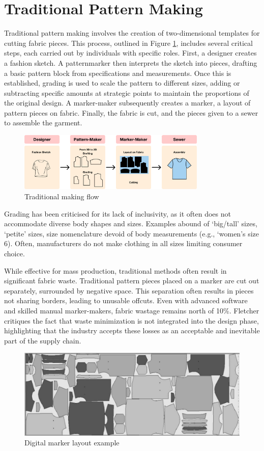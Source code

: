 \section{Traditional Pattern Making}
Traditional pattern making involves the creation of two-dimensional templates for cutting fabric pieces. This process, outlined in Figure \ref{fig:traditional_making_flow}, includes several critical steps, each carried out by individuals with specific roles. First, a designer creates a fashion sketch. A patternmarker then interprets the sketch into pieces, drafting a basic pattern block from specifications and measurements. Once this is established, grading is used to scale the pattern to different sizes, adding or subtracting specific amounts at strategic points to maintain the proportions of the original design. A marker-maker subsequently creates a marker, a layout of pattern pieces on fabric. Finally, the fabric is cut, and the pieces given to a sewer to assemble the garment.
\begin{figure} [H]
    \centering
    \includegraphics[width=0.8\textwidth]{Images/traditional process diagram.png}
    \caption{Traditional making flow}
    \label{fig:traditional_making_flow}
\end{figure}
Grading has been criticised for its lack of inclusivity, as it often does not accommodate diverse body shapes and sizes. Examples abound of ‘big/tall’ sizes, ‘petite’ sizes, size nomenclature devoid of body measurements (e.g., ‘women’s size 6). Often, manufacturers do not make clothing in all sizes limiting consumer choice.

While effective for mass production, traditional methods often result in significant fabric waste. Traditional pattern pieces placed on a marker are cut out separately, surrounded by negative space. This separation often results in pieces not sharing borders, leading to unusable offcuts.  Even with advanced software and skilled manual marker-makers, fabric wastage remains north of 10\%. Fletcher critiques the fact that waste minimization is not integrated into the design phase, highlighting that the industry accepts these losses as an acceptable and inevitable part of the supply chain.
\begin{figure} [H]
    \centering
    \includegraphics[width=\textwidth]{Images/digital marker layout.png}
    \caption{Digital marker layout example}
\end{figure}


